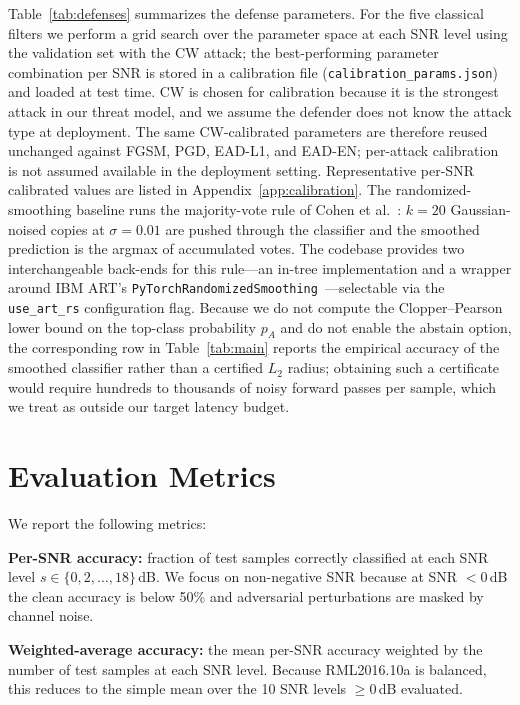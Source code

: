 Table~\ref{tab:defenses} summarizes the defense parameters. For the five
classical filters we perform a grid search over the parameter space at
each SNR level using the validation set with the CW attack; the
best-performing parameter combination per SNR is stored in a calibration
file (\texttt{calibration\_params.json}) and loaded at test time. CW is
chosen for calibration because it is the strongest attack in our threat
model, and we assume the defender does not know the attack type at
deployment. The same CW-calibrated parameters are therefore reused
unchanged against FGSM, PGD, EAD-L1, and EAD-EN; per-attack calibration
is not assumed available in the deployment setting. Representative
per-SNR calibrated values are listed in
Appendix~\ref{app:calibration}. The
randomized-smoothing baseline runs the majority-vote rule of
Cohen et al.~\cite{cohen2019certified}: $k = 20$ Gaussian-noised
copies at $\sigma = 0.01$ are pushed through the classifier and the
smoothed prediction is the argmax of accumulated votes. The codebase
provides two interchangeable back-ends for this rule---an in-tree
implementation and a wrapper around IBM ART's
\texttt{PyTorchRandomizedSmoothing}~\cite{art2018}---selectable via
the \texttt{use\_art\_rs} configuration flag. Because we do not
compute the Clopper--Pearson lower bound on the top-class probability
$p_A$ and do not enable the abstain option, the corresponding row in
Table~\ref{tab:main} reports the empirical accuracy of the smoothed
classifier rather than a certified $L_2$ radius; obtaining such a
certificate would require hundreds to thousands of noisy forward
passes per sample, which we treat as outside our target latency
budget.

\section{Evaluation Metrics}

We report the following metrics:

\textbf{Per-SNR accuracy:} fraction of test samples correctly classified
at each SNR level $s \in \{0, 2, \ldots, 18\}$\,dB. We focus on non-negative
SNR because at SNR $< 0$\,dB the clean accuracy is below 50\% and
adversarial perturbations are masked by channel noise.

\textbf{Weighted-average accuracy:} the mean per-SNR accuracy weighted by
the number of test samples at each SNR level. Because RML2016.10a is
balanced, this reduces to the simple mean over the 10 SNR levels
$\geq 0$\,dB evaluated.


